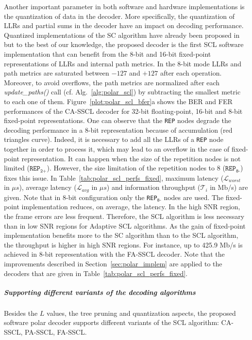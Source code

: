 Another important parameter in both software and hardware implementations is the
quantization of data in the decoder. More specifically, the quantization of LLRs
and partial sums in the decoder have an impact on decoding performance.
Quantized implementations of the SC algorithm have already been proposed
in~\cite{Giard2016} but to the best of our knowledge, the proposed decoder is
the first SCL software implementation that can benefit from the 8-bit and 16-bit
fixed-point representations of LLRs and internal path metrics. In the 8-bit mode
LLRs and path metrics are saturated between $-127$ and $+127$ after each
operation. Moreover, to avoid overflows, the path metrics are normalized after
each \textit{update\_paths()} call (cf. Alg.~\ref{alg:polar_scl}) by subtracting
the smallest metric to each one of them. Figure~\ref{plot:polar_scl_bfer}a shows
the BER and FER performances of the CA-SSCL decoder for 32-bit floating-point,
16-bit and 8-bit fixed-point representations. One can observe that the
\texttt{REP} nodes degrade the decoding performance in a 8-bit representation
because of accumulation (red triangles curve). Indeed, it is necessary to add
all the LLRs of a \texttt{REP} node together in order to process it, which may
lead to an overflow in the case of fixed-point representation. It can happen
when the size of the repetition nodes is not limited
($\texttt{REP}_\texttt{2+}$). However, the size limitation of the repetition
nodes to 8 ($\texttt{REP}_\texttt{8-}$) fixes this issue. In
Table~\ref{tab:polar_scl_perfs_fixed}, maximum latency ($\mathcal{L}_{worst}$ in
$\mu s$), average latency ($\mathcal{L}_{avg}$ in $\mu s$) and information
throughput ($\mathcal{T}_i$ in Mb/s) are given. Note that in 8-bit configuration
only the \texttt{REP}$_{\texttt{8-}}$ nodes are used. The fixed-point
implementation reduces, on average, the latency. In the high SNR region, the
frame errors are less frequent. Therefore, the SCL algorithm is less necessary
than in low SNR regions for Adaptive SCL algorithms. As the gain of fixed-point
implementation benefits more to the SC algorithm than to the SCL algorithm, the
throughput is higher in high SNR regions. For instance, up to 425.9 Mb/s is
achieved in 8-bit representation with the FA-SSCL decoder. Note that the
improvements described in Section~\ref{sec:polar_implem} are applied to the
decoders that are given in Table~\ref{tab:polar_scl_perfs_fixed}.

\subparagraph{Supporting different variants of the decoding algorithms}

Besides the $L$ values, the tree pruning and quantization aspects, the proposed
software polar decoder supports different variants of the SCL algorithm:
CA-SSCL, PA-SSCL, FA-SSCL.

